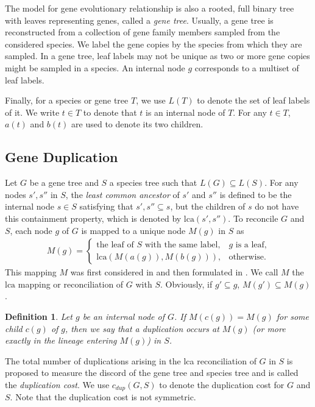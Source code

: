 \documentclass[9.5pt,journal,letterpaper,compsoc]{IEEEtran}
\newtheorem{definition}{\bf Definition}[section]
\begin{document}
The model for gene evolutionary relationship is also a rooted, full
binary tree with leaves representing genes, called a {\it gene
tree}. Usually, a gene tree is reconstructed from a collection of
gene  family members sampled from the considered species. We label
the gene copies by the species from which they are sampled. In a
gene tree, leaf labels may not be unique as two or more  gene copies
might  be sampled in a species. An internal node $g$ corresponds to
a multiset of leaf labels.

Finally, for a species or  gene tree $T$, we use $L(T)$ to denote
the set of leaf labels of it.  We write $t\in T$ to denote that $t$
is an internal node of $T$. For any $t\in T$, $a(t)$ and $b(t)$ are
used to denote its two children.

\subsection{Gene Duplication}

Let $G$ be a gene tree and $S$ a species tree such that
$L(G)\subseteq L(S)$. For any nodes  $s', s''$ in $S$, the {\it
least common ancestor} of $s'$ and $s''$ is defined to be the
internal node $s\in S$ satisfying that $s', s''\subseteq s$, but the
children of $s$ do not have this containment  property, which is
denoted by $\mbox{lca}(s', s'')$.  To reconcile  $G$ and
 $S$, each node $g$ of $G$ is mapped
to a unique node $M(g)$ in $S$ as
\begin{eqnarray*}
 M(g)=\left\{ \begin{array}{ll}
              \mbox{the leaf of $S$ with the same label},
& \mbox{$g$ is a leaf,}\\
            \mbox{lca}\left(M(a(g)), M(b(g))\right), & \mbox{otherwise}.
          \end{array}
        \right.
\end{eqnarray*}
%
This mapping $M$ was first considered in \cite{Goodman_SysZool_79}
and then formulated in \cite{Page_SysBiol_94}. We call $M$ the
$\mbox{lca}$ mapping or reconciliation of $G$ with $S$. Obviously,
if $g'\subseteq g$, $M(g') \subseteq M(g)$.

\begin{definition}
 Let $g$ be an internal node of $G$. If
 $M(c(g))=M(g)$ for some child $c(g)$ of $g$, then
we say that  a duplication occurs at $M(g)$ (or more exactly
in the lineage entering $M(g)$) in $S$.
\end{definition}

The total number of duplications arising in the lca reconciliation of
 $G$ in  $S$ is proposed to measure the discord
of the gene tree and species tree  and is called the
{\it duplication cost}. We use $c_{dup}(G, S)$ to denote the duplication cost
for $G$ and $S$. Note that the duplication cost is not symmetric.
\end{document}
